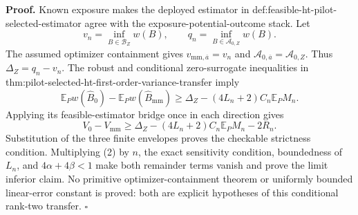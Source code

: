 \textbf{Proof.}
Known exposure makes the deployed estimator in def:feasible-ht-pilot-selected-estimator agree with the exposure-potential-outcome stack.  Let
\[
v_n=\inf_{B\in\mathcal B_Z}w(B),
\qquad q_n=\inf_{B\in\mathcal A_{0,Z}}w(B).
\]
The assumed optimizer containment gives \(v_{\mathrm{mm},\overline a}=v_n\) and \(\mathcal A_{0,\overline a}=\mathcal A_{0,Z}\).  Thus \(\Delta_Z=q_n-v_n\).  The robust and conditional zero-surrogate inequalities in thm:pilot-selected-ht-first-order-variance-transfer imply
\[
\mathbb E_Pw(\widehat B_0)-\mathbb E_Pw(\widehat B_{\mathrm{mm}})
\ge\Delta_Z-(4L_n+2)C_n\mathbb E_PM_n.
\tag{1}
\]
Applying its feasible-estimator bridge once in each direction gives
\[
V_0-V_{\mathrm{mm}}
\ge\Delta_Z-(4L_n+2)C_n\mathbb E_PM_n-2R_n.
\tag{2}
\]
Substitution of the three finite envelopes proves the checkable strictness condition.  Multiplying (2) by \(n\), the exact sensitivity condition, boundedness of \(L_n\), and \(4\alpha+4\beta<1\) make both remainder terms vanish and prove the limit inferior claim.  No primitive optimizer-containment theorem or uniformly bounded linear-error constant is proved: both are explicit hypotheses of this conditional rank-two transfer. \(\square\)